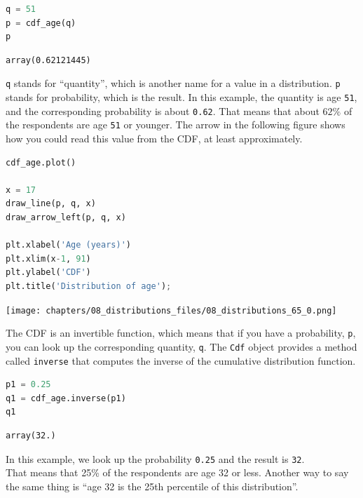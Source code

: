 \begin{lstlisting}[language=Python,style=source]
q = 51
p = cdf_age(q)
p
\end{lstlisting}

\begin{lstlisting}[style=output]
array(0.62121445)
\end{lstlisting}

\passthrough{\lstinline!q!} stands for ``quantity'', which is another
name for a value in a distribution. \passthrough{\lstinline!p!} stands
for probability, which is the result. In this example, the quantity is
age \passthrough{\lstinline!51!}, and the corresponding probability is
about \passthrough{\lstinline!0.62!}. That means that about \(62\%\) of
the respondents are age \passthrough{\lstinline!51!} or younger. The
arrow in the following figure shows how you could read this value from
the CDF, at least approximately.

\begin{lstlisting}[language=Python,style=source]
cdf_age.plot()

x = 17
draw_line(p, q, x)
draw_arrow_left(p, q, x)

plt.xlabel('Age (years)')
plt.xlim(x-1, 91)
plt.ylabel('CDF')
plt.title('Distribution of age');
\end{lstlisting}

\begin{center}
\texttt{[image: chapters/08\_distributions\_files/08\_distributions\_65\_0.png]}
\end{center}

The CDF is an invertible function, which means that if you have a
probability, \passthrough{\lstinline!p!}, you can look up the
corresponding quantity, \passthrough{\lstinline!q!}. The
\passthrough{\lstinline!Cdf!} object provides a method called
\passthrough{\lstinline!inverse!} that computes the inverse of the
cumulative distribution function.

\begin{lstlisting}[language=Python,style=source]
p1 = 0.25
q1 = cdf_age.inverse(p1)
q1
\end{lstlisting}

\begin{lstlisting}[style=output]
array(32.)
\end{lstlisting}

In this example, we look up the probability
\passthrough{\lstinline!0.25!} and the result is
\passthrough{\lstinline!32!}.\\
That means that 25\% of the respondents are age 32 or less. Another way
to say the same thing is ``age 32 is the 25th percentile of this
distribution''.

